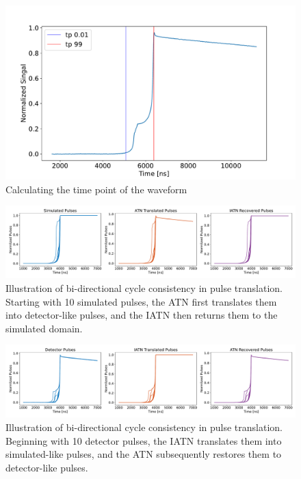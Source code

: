 \begin{figure}%
    \centering
    \includegraphics[width=0.99\linewidth]{ch8/figs/time_calc.pdf}
    \caption{Calculating the time point of the waveform}
    \label{fig:ch8:time_calc}
\end{figure}



\begin{figure}%
    \centering
    \includegraphics[width=0.99\linewidth]{ch8/figs/SEP_result_comp_1x3_cycle_BAB.pdf}
    \caption{Illustration of bi-directional cycle consistency in pulse translation. Starting with 10 simulated pulses, the ATN first translates them into detector-like pulses, and the IATN then returns them to the simulated domain.}
    \label{fig:cycle_bab}
\end{figure}

\begin{figure}%
    \centering
    \includegraphics[width=0.99\linewidth]{ch8/figs/SEP_result_comp_1x3_cycle_ABA.pdf}
    \caption{Illustration of bi-directional cycle consistency in pulse translation. Beginning with 10 detector pulses, the IATN translates them into simulated-like pulses, and the ATN subsequently restores them to detector-like pulses.}
    \label{fig:cycle_aba}
\end{figure}

